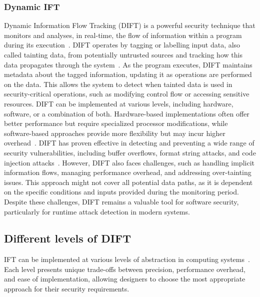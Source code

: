 \subsubsection{Dynamic IFT}
Dynamic Information Flow Tracking (DIFT) is a powerful security technique that monitors and analyses, in real-time, the flow of information within a program during its execution~\cite{CGDJ-21-micromac}. DIFT operates by tagging or labelling input data, also called tainting data, from potentially untrusted sources and tracking how this data propagates through the system~\cite{SLD-04-sigplan}. As the program executes, DIFT maintains metadata about the tagged information, updating it as operations are performed on the data. This allows the system to detect when tainted data is used in security-critical operations, such as modifying control flow or accessing sensitive resources. DIFT can be implemented at various levels, including hardware, software, or a combination of both. Hardware-based implementations often offer better performance but require specialized processor modifications, while software-based approaches provide more flexibility but may incur higher overhead~\cite{CGDJ-21-micromac}. DIFT has proven effective in detecting and preventing a wide range of security vulnerabilities, including buffer overflows, format string attacks, and code injection attacks~\cite{SLD-04-sigplan}. However, DIFT also faces challenges, such as handling implicit information flows, managing performance overhead, and addressing over-tainting issues.
This approach might not cover all potential data paths, as it is dependent on the specific conditions and inputs provided during the monitoring period.
Despite these challenges, DIFT remains a valuable tool for software security, particularly for runtime attack detection in modern systems.

\subsection{Different levels of DIFT}
IFT can be implemented at various levels of abstraction in computing systems~\cite{HAK-21-acmcsur, BSMCVEJCO-21-acmcsur,CGDJ-21-micromac}. Each level presents unique trade-offs between precision, performance overhead, and ease of implementation, allowing designers to choose the most appropriate approach for their security requirements.

